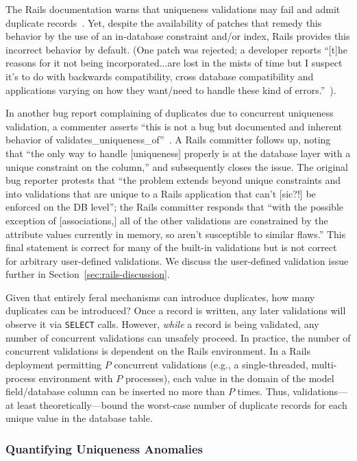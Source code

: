 The Rails documentation warns that uniqueness validations may fail and
admit duplicate records~\cite{rails-guide}. Yet, despite the
availability of patches that remedy this behavior by the use of an
in-database constraint and/or index, Rails provides this incorrect
behavior by default. (One patch was rejected; a developer reports
``[t]he reasons for it not being incorporated...are lost in the mists
of time but I suspect it's to do with backwards compatibility, cross
database compatibility and applications varying on how they want/need
to handle these kind of errors.''~\cite{code-index-patch}).

In another bug report complaining of duplicates due to concurrent
uniqueness validation, a commenter asserts ``this is not a bug but
documented and inherent behavior of
validates\_uniqueness\_of''~\cite{code-index-error}.  A Rails
committer follows up, noting that ``the only way to handle
[uniqueness] properly is at the database layer with a unique
constraint on the column,'' and subsequently closes the issue. The
original bug reporter protests that ``the problem extends beyond
unique constraints and into validations that are unique to a Rails
application that can't [sic?!]  be enforced on the DB level''; the
Rails committer responds that ``with the possible exception of
[associations,] all of the other validations are constrained by the
attribute values currently in memory, so aren't susceptible to similar
flaws.'' This final statement is correct for many of the built-in
validations but is not correct for arbitrary user-defined
validations. We discuss the user-defined validation issue further in
Section~\ref{sec:rails-discussion}.

 Given that entirely feral
mechanisms can introduce duplicates, how many duplicates can be
introduced? Once a record is written, any later validations will
observe it via \texttt{SELECT} calls. However, \textit{while} a record
is being validated, any number of concurrent validations can
unsafely proceed. In practice, the number of concurrent validations
is dependent on the Rails environment. In a Rails deployment
permitting $P$ concurrent validations (e.g., a single-threaded,
multi-process environment with $P$ processes), each value in the
domain of the model field/database column can be inserted no more than
$P$ times. Thus, validations---at least theoretically---bound the
worst-case number of duplicate records for each unique value in the
database table.

\subsubsection{Quantifying Uniqueness Anomalies}

